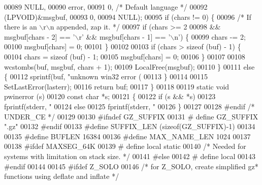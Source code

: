 \begin{DoxyCode}
00089         NULL,
00090         error,
00091         0, \textcolor{comment}{/* Default language */}
00092         (LPVOID)&msgbuf,
00093         0,
00094         NULL);
00095     \textcolor{keywordflow}{if} (chars != 0) \{
00096         \textcolor{comment}{/* If there is an \(\backslash\)r\(\backslash\)n appended, zap it.  */}
00097         \textcolor{keywordflow}{if} (chars >= 2
00098             && msgbuf[chars - 2] == \textcolor{charliteral}{'\(\backslash\)r'} && msgbuf[chars - 1] == \textcolor{charliteral}{'\(\backslash\)n'}) \{
00099             chars -= 2;
00100             msgbuf[chars] = 0;
00101         \}
00102 
00103         \textcolor{keywordflow}{if} (chars > \textcolor{keyword}{sizeof} (buf) - 1) \{
00104             chars = \textcolor{keyword}{sizeof} (buf) - 1;
00105             msgbuf[chars] = 0;
00106         \}
00107 
00108         wcstombs(buf, msgbuf, chars + 1);
00109         LocalFree(msgbuf);
00110     \}
00111     \textcolor{keywordflow}{else} \{
00112         sprintf(buf, \textcolor{stringliteral}{"unknown win32 error (%
00113     \}
00114 
00115     SetLastError(lasterr);
00116     \textcolor{keywordflow}{return} buf;
00117 \}
00118 
00119 \textcolor{keyword}{static} \textcolor{keywordtype}{void} pwinerror (s)
00120     \textcolor{keyword}{const} \textcolor{keywordtype}{char} *s;
00121 \{
00122     \textcolor{keywordflow}{if} (s && *s)
00123         fprintf(stderr, \textcolor{stringliteral}{"%
00124     \textcolor{keywordflow}{else}
00125         fprintf(stderr, \textcolor{stringliteral}{"%
00126 \}
00127 
00128 \textcolor{preprocessor}{#endif }\textcolor{comment}{/* UNDER\_CE */}\textcolor{preprocessor}{}
00129 
00130 \textcolor{preprocessor}{#ifndef GZ\_SUFFIX}
00131 \textcolor{preprocessor}{#  define GZ\_SUFFIX ".gz"}
00132 \textcolor{preprocessor}{#endif}
00133 \textcolor{preprocessor}{#define SUFFIX\_LEN (sizeof(GZ\_SUFFIX)-1)}
00134 
00135 \textcolor{preprocessor}{#define BUFLEN      16384}
00136 \textcolor{preprocessor}{#define MAX\_NAME\_LEN 1024}
00137 
00138 \textcolor{preprocessor}{#ifdef MAXSEG\_64K}
00139 \textcolor{preprocessor}{#  define local static}
00140    \textcolor{comment}{/* Needed for systems with limitation on stack size. */}
00141 \textcolor{preprocessor}{#else}
00142 \textcolor{preprocessor}{#  define local}
00143 \textcolor{preprocessor}{#endif}
00144 
00145 \textcolor{preprocessor}{#ifdef Z\_SOLO}
00146 \textcolor{comment}{/* for Z\_SOLO, create simplified gz* functions using deflate and inflate */}
}}}
\end{DoxyCode}
